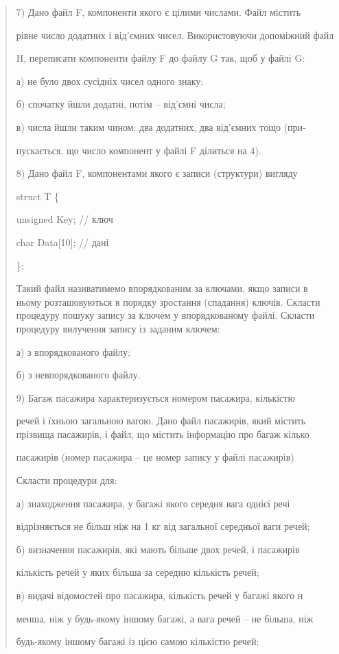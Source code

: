 \documentclass[]{article}
\begin{document}
\begin{quote}
7) Дано файл F, компоненти якого є цілими числами. Файл містить

рівне число додатних і від'ємних чисел. Використовуючи допоміжний файл

H, переписати компоненти файлу F до файлу G так, щоб у файлі G:

а) не було двох сусідніх чисел одного знаку;

б) спочатку йшли додатні, потім -- від'ємні числа;

в) числа йшли таким чином: два додатних, два від'ємних тощо (при-

пускається, що число компонент у файлі F ділиться на 4).

8) Дано файл F, компонентами якого є записи (структури) вигляду

struct T \{

unsigned Key; // ключ

char Data{[}10{]}; // дані

\};

Такий файл називатимемо впорядкованим за ключами, якщо записи в ньому
розташовуються в порядку зростання (спадання) ключів. Скласти процедуру
пошуку запису за ключем у впорядкованому файлі. Скласти процедуру
вилучення запису із заданим ключем:

а) з впорядкованого файлу;

б) з невпорядкованого файлу.

9) Багаж пасажира характеризується номером пасажира, кількістю

речей і їхньою загальною вагою. Дано файл пасажирів, який містить
прізвища пасажирів, і файл, що містить інформацію про багаж кілько

пасажирів (номер пасажира -- це номер запису у файлі пасажирів)

Скласти процедури для:

а) знаходження пасажира, у багажі якого середня вага однієї речі

відрізняється не більш ніж на 1 кг від загальної середньої ваги речей;

б) визначення пасажирів, які мають більше двох речей, і пасажирів

кількість речей у яких більша за середню кількість речей;

в) видачі відомостей про пасажира, кількість речей у багажі якого н

менша, ніж у будь-якому іншому багажі, а вага речей -- не більша, ніж

будь-якому іншому багажі із цією самою кількістю речей;


\end{quote}
\end{document}
